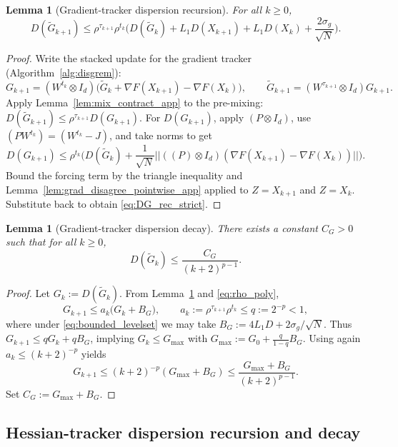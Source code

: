 \documentclass[11pt,a4paper]{article}
\def\one{1}%
\def\J{J}%
\def\Pmat{P}%
\def\norm#1{||#1||}%
\newtheorem{lemma}[theorem]{Lemma}
\newcommand{\one}{\mathbf{1}}
\newcommand{\norm}[1]{\left\|#1\right\|}
\newcommand{\J}{\left(\frac{1}{N}\one\one^\top\right)}
\newcommand{\Pmat}{I-\J}
\begin{document}
	\begin{lemma}[Gradient-tracker dispersion recursion]\label{lem:DG_rec_strict}
		For all $k\ge 0$,
		\begin{equation}\label{eq:DG_rec_strict}
D(\tilde G_{k+1})
\le \rho^{\tau_{k+1}}\rho^{t_k}\Big(D(\tilde G_k)+L_1 D(X_{k+1})+L_1 D(X_k)+\frac{2\sigma_g}{\sqrt N}\Big).
		\end{equation}
	\end{lemma}
	\begin{proof}
		Write the stacked update for the gradient tracker (Algorithm~\ref{alg:disgrem}):
		\[
G_{k+1}=(W^{t_k}\otimes I_d)\Big(\tilde G_k+\nabla F(X_{k+1})-\nabla F(X_k)\Big),
\qquad
\tilde G_{k+1}=(W^{\tau_{k+1}}\otimes I_d)G_{k+1}.
		\]
		Apply Lemma~\ref{lem:mix_contract_app} to the pre-mixing: $D(\tilde G_{k+1})\le \rho^{\tau_{k+1}}D(G_{k+1})$.
		For $D(G_{k+1})$, apply $(\Pmat\otimes I_d)$, use $(\Pmat W^{t_k})=(W^{t_k}-\J)$, and take norms to get
		\[
D(G_{k+1})\le \rho^{t_k}\Big(D(\tilde G_k)+\frac{1}{\sqrt N}\norm{((\Pmat)\otimes I_d)(\nabla F(X_{k+1})-\nabla F(X_k))}\Big).
		\]
		Bound the forcing term by the triangle inequality and Lemma~\ref{lem:grad_disagree_pointwise_app} applied to $Z=X_{k+1}$ and $Z=X_k$.
		Substitute back to obtain \eqref{eq:DG_rec_strict}.
	\end{proof}
	
	\begin{lemma}[Gradient-tracker dispersion decay]\label{lem:DG_decay_strict}
		There exists a constant $C_G>0$ such that for all $k\ge 0$,
		\begin{equation}\label{eq:DG_decay_strict}
			D(\tilde G_k)\le \frac{C_G}{(k+2)^{p-1}}.
		\end{equation}
	\end{lemma}
\begin{proof}
	Let $G_k:=D(\tilde G_k)$. From Lemma~\ref{lem:DG_rec_strict} and \eqref{eq:rho_poly},
	\[
	G_{k+1}\le a_k\big(G_k+B_G\big),\qquad a_k:=\rho^{\tau_{k+1}}\rho^{t_k}\le q:=2^{-p}<1,
	\]
	where under \eqref{eq:bounded_levelset} we may take $B_G:=4L_1D+2\sigma_g/\sqrt N$.
	Thus $G_{k+1}\le qG_k+qB_G$, implying $G_k\le G_{\max}$ with
	$G_{\max}:=G_0+\frac{q}{1-q}B_G$.
	Using again $a_k\le (k+2)^{-p}$ yields
	\[
	G_{k+1}\le (k+2)^{-p}(G_{\max}+B_G)\le \frac{G_{\max}+B_G}{(k+2)^{p-1}}.
	\]
	Set $C_G:=G_{\max}+B_G$.
\end{proof}
	
	\subsection{Hessian-tracker dispersion recursion and decay}
	
\end{document}
